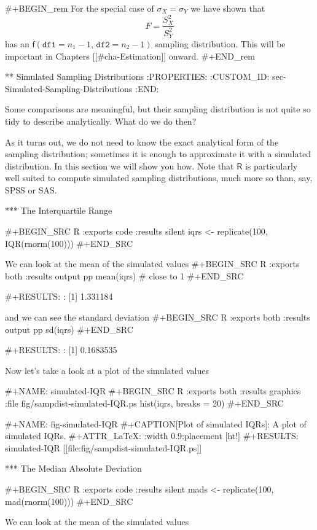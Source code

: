#+BEGIN_rem
For the special case of \(\sigma_{X}=\sigma_{Y}\) we have shown that
\begin{equation}
F=\frac{S_{X}^{2}}{S_{Y}^{2}}
\end{equation}
has an \(\mathsf{f}(\mathtt{df1}=n_{1}-1,\,\mathtt{df2}=n_{2}-1)\)
sampling distribution. This will be important in Chapters
[[#cha-Estimation]] onward.
#+END_rem

** Simulated Sampling Distributions
:PROPERTIES:
:CUSTOM_ID: sec-Simulated-Sampling-Distributions
:END:

Some comparisons are meaningful, but their sampling distribution is
not quite so tidy to describe analytically. What do we do then?

As it turns out, we do not need to know the exact analytical form of
the sampling distribution; sometimes it is enough to approximate it
with a simulated distribution. In this section we will show you
how. Note that \(\mathsf{R}\) is particularly well suited to compute
simulated sampling distributions, much more so than, say, SPSS or SAS.

*** The Interquartile Range

#+BEGIN_SRC R :exports code :results silent 
iqrs <- replicate(100, IQR(rnorm(100)))
#+END_SRC

We can look at the mean of the simulated values
#+BEGIN_SRC R :exports both :results output pp 
mean(iqrs)    # close to 1
#+END_SRC

#+RESULTS:
: [1] 1.331184

and we can see the standard deviation
#+BEGIN_SRC R :exports both :results output pp 
sd(iqrs)
#+END_SRC

#+RESULTS:
: [1] 0.1683535

Now let's take a look at a plot of the simulated values

#+NAME: simulated-IQR
#+BEGIN_SRC R :exports both :results graphics :file fig/sampdist-simulated-IQR.ps
hist(iqrs, breaks = 20)
#+END_SRC

#+NAME: fig-simulated-IQR
#+CAPTION[Plot of simulated IQRs]: \small A plot of simulated IQRs.
#+ATTR_LaTeX: :width 0.9\textwidth :placement [ht!]
#+RESULTS: simulated-IQR
[[file:fig/sampdist-simulated-IQR.ps]]

*** The Median Absolute Deviation

#+BEGIN_SRC R :exports code :results silent
mads <- replicate(100, mad(rnorm(100)))
#+END_SRC

We can look at the mean of the simulated values

